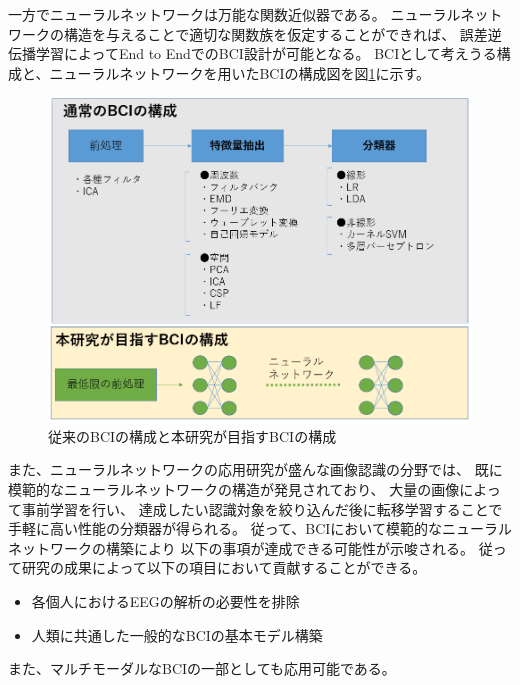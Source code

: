 一方でニューラルネットワークは万能な関数近似器である。
ニューラルネットワークの構造を与えることで適切な関数族を仮定することができれば、
誤差逆伝播学習によってEnd to EndでのBCI設計が可能となる。
BCIとして考えうる構成と、ニューラルネットワークを用いたBCIの構成図を図\ref{fig:BCIpattern}に示す。
\begin{figure}
    \centering
    \includegraphics[width=15cm]{images/BCIpattern.PNG}
    \caption{従来のBCIの構成と本研究が目指すBCIの構成}
    \label{fig:BCIpattern}
\end{figure}

また、ニューラルネットワークの応用研究が盛んな画像認識の分野では、
既に模範的なニューラルネットワークの構造が発見されており、
大量の画像によって事前学習を行い、
達成したい認識対象を絞り込んだ後に転移学習することで
手軽に高い性能の分類器が得られる。
従って、BCIにおいて模範的なニューラルネットワークの構築により
以下の事項が達成できる可能性が示唆される。
従って研究の成果によって以下の項目において貢献することができる。
\begin{itemize}
    \item 各個人におけるEEGの解析の必要性を排除
    \item 人類に共通した一般的なBCIの基本モデル構築
\end{itemize}
また、マルチモーダルなBCIの一部としても応用可能である。



